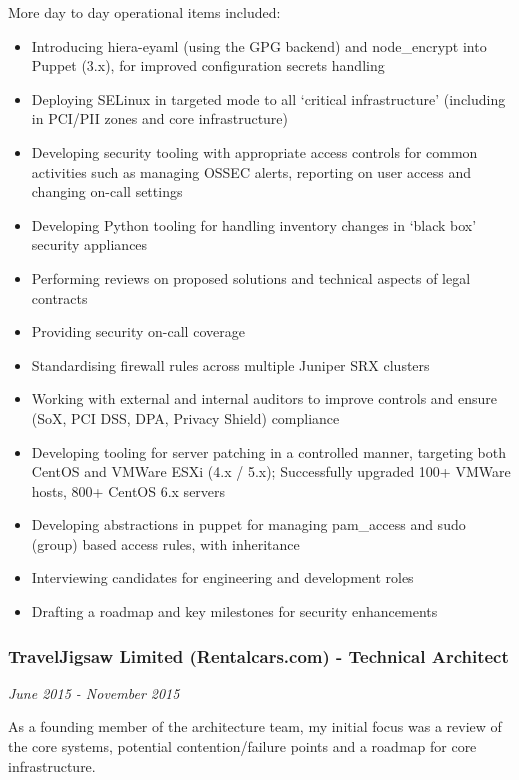 More day to day operational items included:

\begin{itemize}
\tightlist
\item
  Introducing hiera-eyaml (using the GPG backend) and node\_encrypt into
  Puppet (3.x), for improved configuration secrets handling
\item
  Deploying SELinux in targeted mode to all `critical infrastructure'
  (including in PCI/PII zones and core infrastructure)
\item
  Developing security tooling with appropriate access controls for
  common activities such as managing OSSEC alerts, reporting on user
  access and changing on-call settings
\item
  Developing Python tooling for handling inventory changes in `black
  box' security appliances
\item
  Performing reviews on proposed solutions and technical aspects of
  legal contracts
\item
  Providing security on-call coverage
\item
  Standardising firewall rules across multiple Juniper SRX clusters
\item
  Working with external and internal auditors to improve controls and
  ensure (SoX, PCI DSS, DPA, Privacy Shield) compliance
\item
  Developing tooling for server patching in a controlled manner,
  targeting both CentOS and VMWare ESXi (4.x / 5.x); Successfully
  upgraded 100+ VMWare hosts, 800+ CentOS 6.x servers
\item
  Developing abstractions in puppet for managing pam\_access and sudo
  (group) based access rules, with inheritance
\item
  Interviewing candidates for engineering and development roles
\item
  Drafting a roadmap and key milestones for security enhancements
\end{itemize}

\subsubsection{TravelJigsaw Limited (Rentalcars.com) - Technical
Architect}\label{traveljigsaw-limited-rentalcars.com---technical-architect}

\emph{June 2015 - November 2015}

As a founding member of the architecture team, my initial focus was a
review of the core systems, potential contention/failure points and a
roadmap for core infrastructure.

